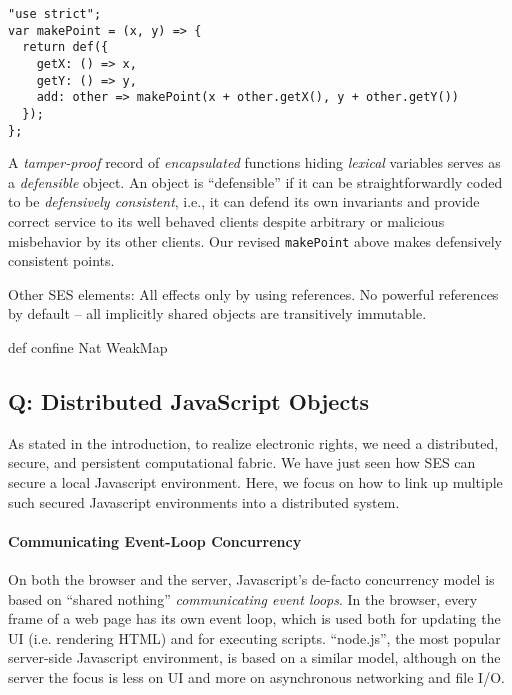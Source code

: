 \documentclass{llncs}
\begin{document}
\begin{verbatim}
"use strict";
var makePoint = (x, y) => {
  return def({
    getX: () => x,
    getY: () => y,
    add: other => makePoint(x + other.getX(), y + other.getY())
  });
};
\end{verbatim}

A \emph{tamper-proof} record of \emph{encapsulated} functions hiding \emph{lexical} variables serves as a \emph{defensible} object. An object is ``defensible'' if it can be straightforwardly coded to be \emph{defensively consistent}\cite{RobustComposition}, i.e., it can defend its own invariants and provide correct service to its well behaved clients despite arbitrary or malicious misbehavior by its other clients. Our revised {\tt makePoint} above makes defensively consistent points.

Other SES elements: 
All effects only by using references.
No powerful references by default -- all implicitly shared objects are transitively immutable. 

def
confine
Nat
WeakMap

\subsection{Q: Distributed JavaScript Objects}

As stated in the introduction, to realize electronic rights, we need a distributed, secure, and persistent computational fabric. We have just seen how SES can secure a local Javascript environment. Here, we focus on how to link up multiple such secured Javascript environments into a distributed system.


\paragraph{Communicating Event-Loop Concurrency}

On both the browser and the server, Javascript's de-facto concurrency model is based on ``shared nothing'' \emph{communicating event loops}. In the browser, every frame of a web page has its own event loop, which is used both for updating the UI (i.e. rendering HTML) and for executing scripts. ``node.js'', the most popular server-side Javascript environment, is based on a similar model, although on the server the focus is less on UI and more on asynchronous networking and file I/O.
\end{document}

